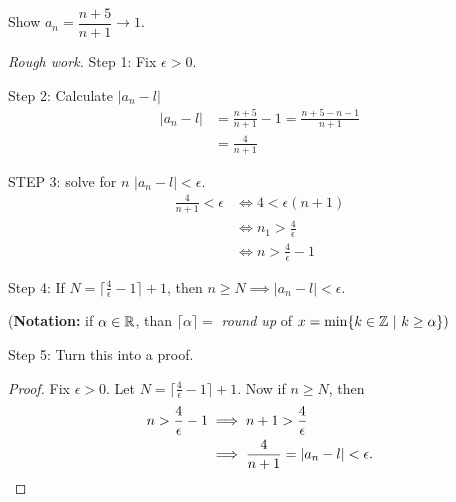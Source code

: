 \documentclass[10pt]{scrartcl}
\begin{document}
\begin{example}
Show $a_n= \dfrac{n+5}{n+1} \to 1$.


\emph{Rough work.} 
Step 1: Fix $\epsilon >0$. 

Step 2: Calculate $|a_n-l|$
\[
\begin{aligned}
  |a_n - l| &= \frac{n+5}{n+1} - 1 = \frac{n+5-n-1}{n+1}\\
  &= \frac{4}{n+1}
\end{aligned}
\]

STEP 3: solve for $n$ $|a_n - l| < \epsilon$. 
\[
\begin{aligned}
  \frac{4}{n+1} < \epsilon &\iff 4 < \epsilon(n+1)\\
  &\iff n_1 > \frac{4}{\epsilon}\\
  &\iff n > \frac{4}{\epsilon} -1
\end{aligned}
\]


Step 4: If $N = \lceil \frac{4}{\epsilon} -1\rceil + 1$, then $n \geq N \implies |a_n -l| < \epsilon$.\vspace*{5pt}

(\textbf{Notation:} if $\alpha \in \mathbb{R}$, than $\lceil \alpha\rceil =$ \emph{round up} of $x = \min \{k\in\mathbb{Z} ~|~ k \geq \alpha\})$

Step 5: Turn this into a proof. 

\begin{proof}
Fix $\epsilon >0.$ Let $N = \lceil \frac{4}{\epsilon} -1\rceil +1$. Now if $n \geq N$, then 
\begin{align*}
  n > \frac{4}{\epsilon} - 1 &\implies n + 1> \frac{4}{\epsilon}\\
  &\implies \frac{4}{n+1} = |a_n - l| < \epsilon.\qedhere
\end{align*}
\end{proof}
\end{example}\vspace*{5pt}

	
	
\end{document}
